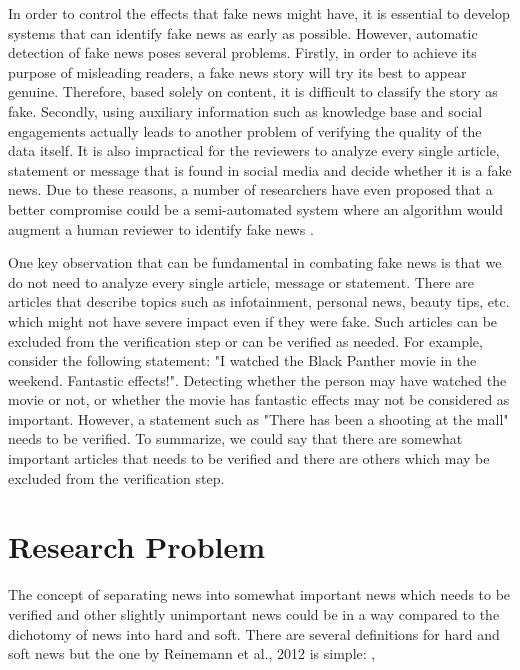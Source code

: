In order to control the effects that fake news might have, it is essential to develop systems that can identify fake news as early as possible. However, automatic detection of fake news poses several problems. Firstly, in order to achieve its purpose of misleading readers, a fake news story will try its best to appear genuine. Therefore, based solely on content, it is difficult to classify the story as fake. Secondly, using auxiliary information such as knowledge base and social engagements actually leads to another problem of verifying the quality of the data itself\cite{shu2017fake}. It is also impractical for the reviewers to analyze every single article, statement or message that is found in social media and decide whether it is a fake news. Due to these reasons, a number of researchers have even proposed that a better compromise could be a semi-automated system where an algorithm would augment a human reviewer to identify fake news \cite{conroy2015automatic, chen2015news, wiegand2016veracity}.

One key observation that can be fundamental in combating fake news is that we do not need to analyze every single article, message or statement. There are articles that describe topics such as infotainment, personal news, beauty tips, etc. which might not have severe impact even if they were fake. Such articles can be excluded from the verification step or can be verified as needed. For example, consider the following statement: "I watched the Black Panther movie in the weekend. Fantastic effects!". Detecting whether the person may have watched the movie or not, or whether the movie has fantastic effects may not be considered as important. However, a statement such as "There has been a shooting at the mall" needs to be verified.
To summarize, we could say that there are somewhat important articles that needs to be verified and there are others which may be excluded from the verification step.

\section{Research Problem} \label{intro:research}
The concept of separating news into somewhat important news which needs to be verified and other slightly unimportant news could be in a way compared to the dichotomy of news into hard and soft. There are several definitions for hard and soft news \cite{reinemann2012hard, shoemaker2012news} but the one by Reinemann et al., 2012 is simple: \cite{reinemann2012hard},

